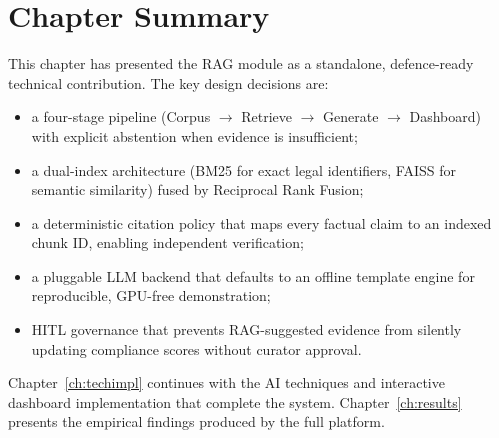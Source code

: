 \section{Chapter Summary}
\label{sec:rag-summary-ch}

This chapter has presented the RAG module as a standalone, defence-ready technical
contribution. The key design decisions are:

\begin{itemize}[noitemsep]
  \item a four-stage pipeline (Corpus $\to$ Retrieve $\to$ Generate $\to$
        Dashboard) with explicit abstention when evidence is insufficient;
  \item a dual-index architecture (BM25 for exact legal identifiers, FAISS for
        semantic similarity) fused by Reciprocal Rank Fusion;
  \item a deterministic citation policy that maps every factual claim to an
        indexed chunk ID, enabling independent verification;
  \item a pluggable LLM backend that defaults to an offline template engine for
        reproducible, GPU-free demonstration;
  \item HITL governance that prevents RAG-suggested evidence from silently
        updating compliance scores without curator approval.
\end{itemize}

Chapter~\ref{ch:techimpl} continues with the AI techniques and interactive
dashboard implementation that complete the system. Chapter~\ref{ch:results}
presents the empirical findings produced by the full platform.
